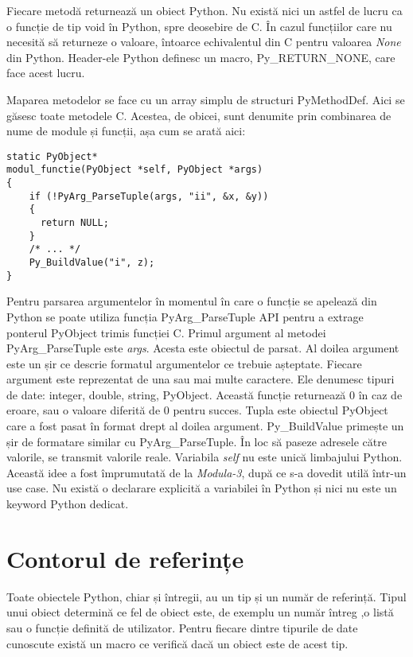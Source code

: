 Fiecare metodă returnează un obiect Python. Nu există nici un astfel de lucru ca o funcție de tip void în Python, spre deosebire de C. În cazul funcțiilor care nu necesită să returneze o valoare, întoarce echivalentul din C  pentru valoarea \textit{None} din Python. Header-ele Python definesc un macro, Py\_RETURN\_NONE, care face acest lucru.

Maparea metodelor se face cu un array simplu de structuri PyMethodDef. Aici se găsesc toate metodele C. Acestea, de obicei, sunt denumite prin combinarea de nume de module și funcții, așa cum se arată aici:
\lstset{language=C,frame=single, showstringspaces=false}
\begin{lstlisting}
static PyObject*
modul_functie(PyObject *self, PyObject *args) 
{
	if (!PyArg_ParseTuple(args, "ii", &x, &y)) 
	{
      return NULL;
   	}
    /* ... */
    Py_BuildValue("i", z);
}
\end{lstlisting}

Pentru parsarea argumentelor în momentul în care o funcție se apelează din Python se poate utiliza funcția PyArg\_ParseTuple API pentru a extrage ponterul PyObject trimis funcției C. Primul argument al metodei PyArg\_ParseTuple este \textit{args}. Acesta este obiectul de parsat. Al doilea argument este un șir ce descrie formatul argumentelor ce trebuie așteptate. Fiecare argument este reprezentat de una sau mai multe caractere. Ele denumesc tipuri de date: integer, double, string, PyObject. Această funcție returnează 0 în caz de eroare, sau o valoare diferită de 0 pentru succes. Tupla este obiectul PyObject care a fost pasat în format drept al doilea argument. Py\_BuildValue primește un șir de formatare similar cu PyArg\_ParseTuple. În loc să paseze adresele către valorile, se transmit valorile reale. Variabila \textit{self} nu este unică limbajului Python. Această idee a fost împrumutată de la \textit{Modula-3}, după ce s-a dovedit utilă într-un use case. Nu există o declarare explicită a variabilei în Python și nici nu este un keyword Python dedicat.

\section{Contorul de referințe}

Toate obiectele Python, chiar și întregii, au un tip și un număr de referință. Tipul unui obiect determină ce fel de obiect este, de exemplu un număr întreg ,o listă sau o funcție definită de utilizator. Pentru fiecare dintre tipurile de date cunoscute există un macro ce verifică dacă un obiect este de acest tip.

